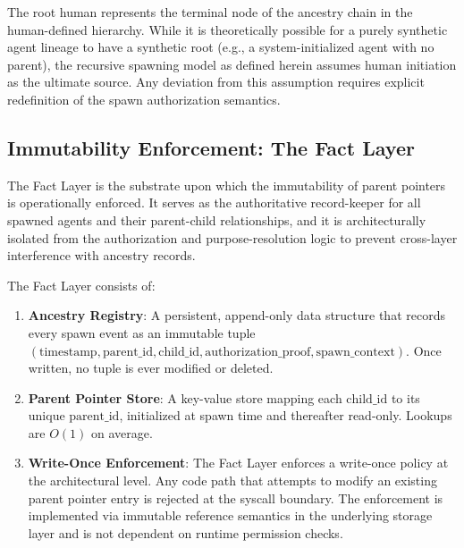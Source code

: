 \begin{note}
The root human represents the terminal node of the ancestry chain in the human-defined hierarchy. While it is theoretically possible for a purely synthetic agent lineage to have a synthetic root (e.g., a system-initialized agent with no parent), the recursive spawning model as defined herein assumes human initiation as the ultimate source. Any deviation from this assumption requires explicit redefinition of the spawn authorization semantics.
\end{note}

\subsection{Immutability Enforcement: The Fact Layer}
\label{sec:fact-layer-enforcement}

The Fact Layer is the substrate upon which the immutability of parent pointers is operationally enforced. It serves as the authoritative record-keeper for all spawned agents and their parent-child relationships, and it is architecturally isolated from the authorization and purpose-resolution logic to prevent cross-layer interference with ancestry records.

\begin{architecture}
\label{arch:fact-layer}
The Fact Layer consists of:
\begin{enumerate}
\item \textbf{Ancestry Registry}: A persistent, append-only data structure that records every spawn event as an immutable tuple $(\text{timestamp}, \text{parent\_id}, \text{child\_id}, \text{authorization\_proof}, \text{spawn\_context})$. Once written, no tuple is ever modified or deleted.

\item \textbf{Parent Pointer Store}: A key-value store mapping each $\text{child\_id}$ to its unique $\text{parent\_id}$, initialized at spawn time and thereafter read-only. Lookups are $O(1)$ on average.

\item \textbf{Write-Once Enforcement}: The Fact Layer enforces a write-once policy at the architectural level. Any code path that attempts to modify an existing parent pointer entry is rejected at the syscall boundary. The enforcement is implemented via immutable reference semantics in the underlying storage layer and is not dependent on runtime permission checks.
\end{enumerate}
\end{architecture}

